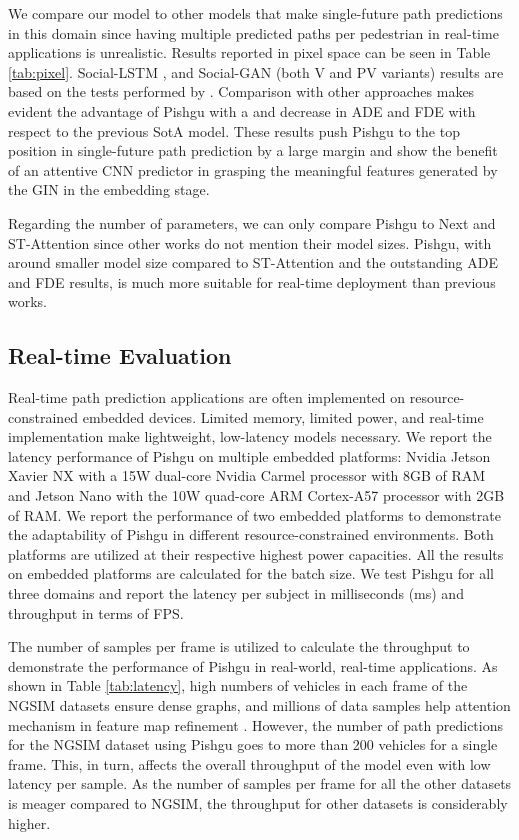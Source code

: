 \documentclass[sigconf]{acmart}
\begin{document}
We compare our model to other models that make single-future path predictions in this domain since having multiple predicted paths per pedestrian in real-time applications is unrealistic. Results reported in pixel space can be seen in Table \ref{tab:pixel}. Social-LSTM \cite{alahi2016social}, and Social-GAN (both V and PV variants) results are based on the tests performed by \cite{liang2019peeking}. Comparison with other approaches makes evident the advantage of Pishgu with a  and  decrease in ADE and FDE with respect to the previous SotA model. These results push Pishgu to the top position in single-future path prediction by a large margin and show the benefit of an attentive CNN predictor in grasping the meaningful features generated by the GIN in the embedding stage.

Regarding the number of parameters, we can only compare Pishgu to Next \cite{liang2019peeking} and ST-Attention \cite{zhao2020spatial} since other works do not mention their model sizes. Pishgu, with around  smaller model size compared to ST-Attention and the outstanding ADE and FDE results, is much more suitable for real-time deployment than previous works. 

\subsection{Real-time Evaluation} \label{sec:realtime}



Real-time path prediction applications are often implemented on resource-constrained embedded devices. Limited memory, limited power, and real-time implementation make lightweight, low-latency models necessary. We report the latency performance of Pishgu on multiple embedded platforms: Nvidia Jetson Xavier NX with a 15W dual-core Nvidia Carmel processor with 8GB of RAM and Jetson Nano with the 10W quad-core ARM Cortex-A57 processor with 2GB of RAM. We report the performance of two embedded platforms to demonstrate the adaptability of Pishgu in different resource-constrained environments. Both platforms are utilized at their respective highest power capacities. All the results on embedded platforms are calculated for the batch size. We test Pishgu for all three domains and report the latency per subject in milliseconds (ms) and throughput in terms of FPS.

The number of samples per frame is utilized to calculate the throughput to demonstrate the performance of Pishgu in real-world, real-time applications. As shown in Table \ref{tab:latency}, high numbers of vehicles in each frame of the NGSIM datasets ensure dense graphs, and millions of data samples help attention mechanism in feature map refinement \cite{cbam18}. However, the number of path predictions for the NGSIM dataset using Pishgu goes to more than 200 vehicles for a single frame. This, in turn, affects the overall throughput of the model even with low latency per sample. As the number of samples per frame for all the other datasets is meager compared to NGSIM, the throughput for other datasets is considerably higher. 
\end{document}
